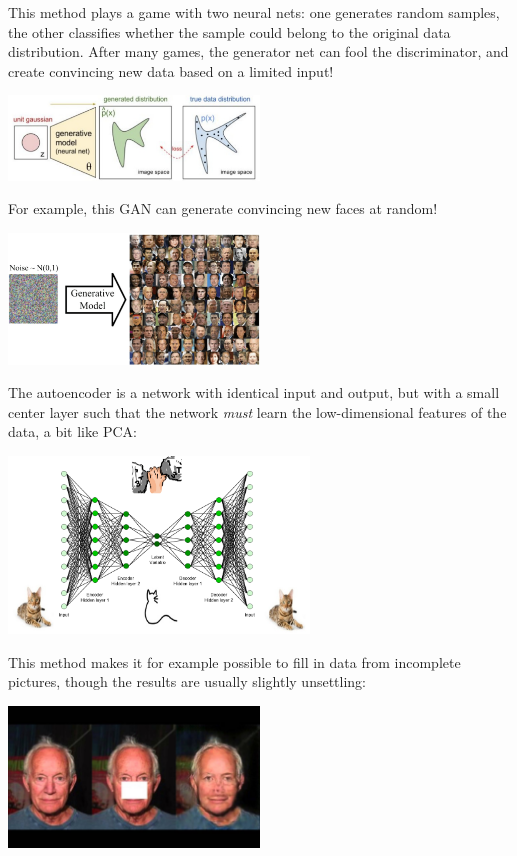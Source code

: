 \documentclass{article}
\begin{document}
\begin{spexample}
    This method plays a game with two neural nets: one generates random samples, the other classifies whether the sample could belong to the original data distribution. After many games, the generator net can fool the discriminator, and create convincing new data based on a limited input!
    \begin{center}\includegraphics[width=0.5\textwidth]{Generativemodel.png}\end{center}
    For example, this GAN can generate convincing new faces at random!
    \begin{center}\includegraphics[width=0.5\textwidth]{GAN_4.png}\end{center}
\end{spexample}
\begin{spexample}[Autoencoders]
    The autoencoder is a network with identical input and output, but with a small center layer such that the network \textit{must} learn the low-dimensional features of the data, a bit like PCA:
    \begin{center}\includegraphics[width=0.6\textwidth]{autoencoder_cat.png}\end{center}
    This method makes it for example possible to fill in data from incomplete pictures, though the results are usually slightly unsettling:
    \begin{center}\includegraphics[width=0.5\textwidth,trim={0cm 4cm 0cm 4cm},clip]{onemanautoencoder.jpg}\end{center}
\end{spexample}
\end{document}
